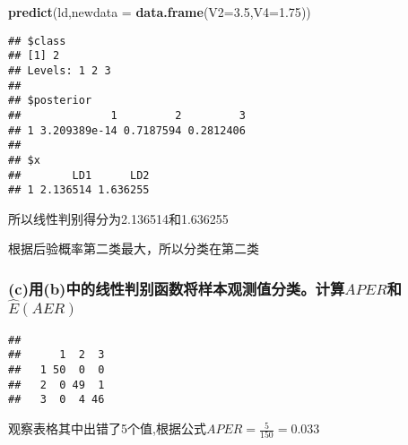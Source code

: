 \documentclass[
]{article}
\newenvironment{Shaded}{\begin{snugshade}}{\end{snugshade}}
\newcommand{\CommentTok}[1]{\textcolor[rgb]{0.56,0.35,0.01}{\textit{#1}}}
\newcommand{\DataTypeTok}[1]{\textcolor[rgb]{0.13,0.29,0.53}{#1}}
\newcommand{\DecValTok}[1]{\textcolor[rgb]{0.00,0.00,0.81}{#1}}
\newcommand{\FloatTok}[1]{\textcolor[rgb]{0.00,0.00,0.81}{#1}}
\newcommand{\KeywordTok}[1]{\textcolor[rgb]{0.13,0.29,0.53}{\textbf{#1}}}
\newcommand{\NormalTok}[1]{#1}
\newcommand{\OperatorTok}[1]{\textcolor[rgb]{0.81,0.36,0.00}{\textbf{#1}}}
\begin{document}
\begin{Shaded}
\begin{Highlighting}[]
\KeywordTok{predict}\NormalTok{(ld,}\DataTypeTok{newdata =} \KeywordTok{data.frame}\NormalTok{(}\DataTypeTok{V2=}\FloatTok{3.5}\NormalTok{,}\DataTypeTok{V4=}\FloatTok{1.75}\NormalTok{))}
\end{Highlighting}
\end{Shaded}

\begin{verbatim}
## $class
## [1] 2
## Levels: 1 2 3
## 
## $posterior
##              1         2         3
## 1 3.209389e-14 0.7187594 0.2812406
## 
## $x
##        LD1      LD2
## 1 2.136514 1.636255
\end{verbatim}

所以线性判别得分为2.136514和1.636255

根据后验概率第二类最大，所以分类在第二类

\hypertarget{cux7528bux4e2dux7684ux7ebfux6027ux5224ux522bux51fdux6570ux5c06ux6837ux672cux89c2ux6d4bux503cux5206ux7c7bux8ba1ux7b97aperux548chateaer}{%
\subsubsection{\texorpdfstring{(c)用(b)中的线性判别函数将样本观测值分类。计算\(APER\)和\(\hat{E}(AER)\)}{(c)用(b)中的线性判别函数将样本观测值分类。计算APER和\textbackslash hat\{E\}(AER)}}\label{cux7528bux4e2dux7684ux7ebfux6027ux5224ux522bux51fdux6570ux5c06ux6837ux672cux89c2ux6d4bux503cux5206ux7c7bux8ba1ux7b97aperux548chateaer}}

\begin{Shaded}
\end{Shaded}

\begin{verbatim}
##    
##      1  2  3
##   1 50  0  0
##   2  0 49  1
##   3  0  4 46
\end{verbatim}

观察表格其中出错了5个值,根据公式\(APER=\frac{5}{150}=0.033\)

\begin{Shaded}
\end{Shaded}
\end{document}
